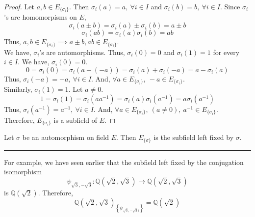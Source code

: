 \begin{proof} 
	Let $a,b \in E_{\{\sigma_i\}}$.
	Then $\sigma_i(a) = a,\ \forall i \in I$ and $\sigma_i(b) = b,\ \forall i \in I$.
	Since $\sigma_i$'s are homomorpisms on $E$,
	\[ \sigma_i(a \pm b) = \sigma_i(a) \pm \sigma_i(b) = a \pm b \]
	\[ \sigma_i(ab) = \sigma_i(a)\sigma_i(b) = ab \]
	Thus, $a,b \in E_{\{\sigma_i\}} \implies a \pm b, ab \in E_{\{\sigma_i\}}$.\\

	We have, $\sigma_i$'s are automorphisms.
	Thus, $\sigma_i(0) = 0$ and $\sigma_i(1) = 1$ for every $i \in I$.
	We have, $\sigma_i(0) = 0$.
	\[ 0 = \sigma_i(0) = \sigma_i(a+(-a)) = \sigma_i(a) + \sigma_i(-a) = a -\sigma_i(a) \]
	Thus, $\sigma_i(-a) = -a,\ \forall i \in I$.
	And, $\forall a \in E_{\{\sigma_i\}},\ -a \in E_{\{\sigma_i\}}$.	\\
	Similarly, $\sigma_i(1) =1$.
	Let $a \ne 0$.
	\[ 1 = \sigma_i(1) = \sigma_i(aa^{-1}) = \sigma_i(a) \sigma_i(a^{-1}) = a\sigma_i(a^{-1}) \]
	Thus, $\sigma_i(a^{-1}) = a^{-1},\ \forall i \in I$.
	And,  $\forall a \in E_{\{\sigma_i\}},\ (a \ne 0),\ a^{-1} \in E_{\{\sigma_i\}}$.
	Therefore, $E_{\{\sigma_i\}}$ is a subfield of $E$.
\end{proof} 

\begin{definition}
	Let $\sigma$ be an automorphism on field $E$.
	Then $E_{\{\sigma\}}$ is the subfield left fixed by $\sigma$.
\end{definition}
\hrule \vspace{1em}
For example, we have seen earlier that the subfield left fixed by the conjugation isomorphism 
\[ \psi_{\sqrt{3},-\sqrt{3}} : \mathbb{Q}\left(\sqrt{2},\sqrt{3}\right) \to \mathbb{Q}\left(\sqrt{2},\sqrt{3}\right)\]
is $\mathbb{Q}\left(\sqrt{2}\right)$.
Therefore,
\[ \mathbb{Q} \left( \sqrt{2},\sqrt{3} \right)_{\left\{ \psi_{\sqrt{3},-\sqrt{3})}\right\}} = \mathbb{Q}\left(\sqrt{2}\right) \]

